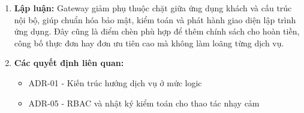 \documentclass[11pt,a4paper]{article}
\begin{document}
\begin{adrbox}[title={ADR-02: Sử Dụng API Gateway Làm Điểm Vào Thống Nhất}]
\begin{enumerate}[leftmargin=1.9em,label=\arabic*.]
\begin{enumerate}[label=(\alph*),leftmargin=2.1em]
    \item \textbf{Backend for Frontend riêng cho từng ứng dụng khách}: Có ích khi giao diện khác biệt quá lớn, nhưng hiện tại có thể trì hoãn đến khi độ phức tạp tăng cao hơn.
  \end{enumerate}
  \item \textbf{Lập luận:} Gateway giảm phụ thuộc chặt giữa ứng dụng khách và cấu trúc nội bộ, giúp chuẩn hóa bảo mật, kiểm toán và phát hành giao diện lập trình ứng dụng. Đây cũng là điểm chèn phù hợp để thêm chính sách cho hoàn tiền, công bố thực đơn hay đơn ưu tiên cao mà không làm loãng từng dịch vụ.
  \item \textbf{Các quyết định liên quan:}
  \begin{itemize}[leftmargin=1.8em]
    \item ADR-01 - Kiến trúc hướng dịch vụ ở mức logic
    \item ADR-05 - RBAC và nhật ký kiểm toán cho thao tác nhạy cảm
  \end{itemize}
\end{enumerate}
\end{adrbox}
\end{document}
